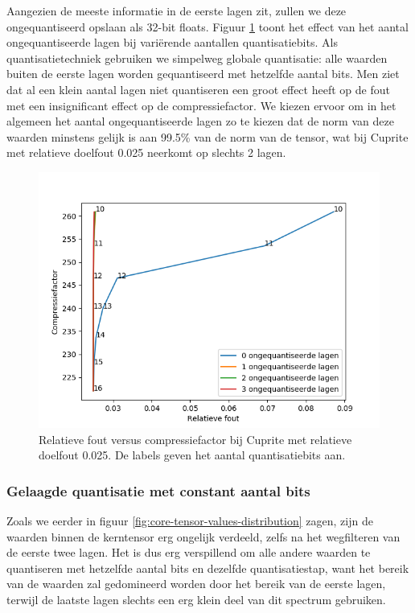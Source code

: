 \newpage
Aangezien de meeste informatie in de eerste lagen zit, zullen we deze ongequantiseerd opslaan als 32-bit floats. Figuur \ref{fig:core-tensor-unquantized-portion} toont het effect van het aantal ongequantiseerde lagen bij vari\"erende aantallen quantisatiebits. Als quantisatietechniek gebruiken we simpelweg globale quantisatie: alle waarden buiten de eerste lagen worden gequantiseerd met hetzelfde aantal bits. Men ziet dat al een klein aantal lagen niet quantiseren een groot effect heeft op de fout met een insignificant effect op de compressiefactor. We kiezen ervoor om in het algemeen het aantal ongequantiseerde lagen zo te kiezen dat de norm van deze waarden minstens gelijk is aan 99.5\% van de norm van de tensor, wat bij Cuprite met relatieve doelfout 0.025 neerkomt op slechts 2 lagen.

\begin{figure}[H]
  \centering
  \includegraphics[scale=0.7]{images/core_tensor_unquantized_portion.png}
  \caption{Relatieve fout versus compressiefactor bij Cuprite met relatieve doelfout 0.025. De labels geven het aantal quantisatiebits aan.}
\label{fig:core-tensor-unquantized-portion}
\end{figure}

\subsubsection{Gelaagde quantisatie met constant aantal bits}

Zoals we eerder in figuur \ref{fig:core-tensor-values-distribution} zagen, zijn de waarden binnen de kerntensor erg ongelijk verdeeld, zelfs na het wegfilteren van de eerste twee lagen. Het is dus erg verspillend om alle andere waarden te quantiseren met hetzelfde aantal bits en dezelfde quantisatiestap, want het bereik van de waarden zal gedomineerd worden door het bereik van de eerste lagen, terwijl de laatste lagen slechts een erg klein deel van dit spectrum gebruiken.\\

